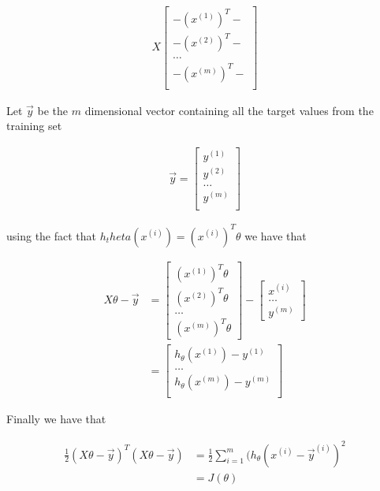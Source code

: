 \documentclass[11pt]{exam}
\newcommand{\idx}[2]{#1^{(#2)}}
\begin{document}
\begin{align*}
X \begin{bmatrix}
- (x^{(1)})^T - \\
- (x^{(2)})^T - \\
\dots\\
- (x^{(m)})^T - \\
\end{bmatrix}
\end{align*}

Let $\vec{y}$ be the $m$ dimensional vector containing all the target values from the training set

\begin{align*}
\vec{y} = \begin{bmatrix}
\idx{y}{1}\\
\idx{y}{2}\\
\dots\\
\idx{y}{m}\\
\end{bmatrix}
\end{align*}

using the fact that $h_theta(\idx{x}{i}) = (\idx{x}{i})^T\theta$ we have that

\begin{align*}
X\theta - \vec{y} &= \begin{bmatrix}
(\idx{x}{1})^T\theta\\
(\idx{x}{2})^T\theta\\
\dots\\
(\idx{x}{m})^T\theta
\end{bmatrix} - \begin{bmatrix}
\idx{x}{i}\\
\dots\\
\idx{y}{m}
\end{bmatrix}\\
&= \begin{bmatrix}
h_\theta(\idx{x}{1}) - \idx{y}{1}\\
\dots\\
h_\theta(\idx{x}{m}) - \idx{y}{m}\\
\end{bmatrix}
\end{align*}

Finally we have that 

\begin{align*}
\frac{1}{2}(X\theta - \vec{y})^T(X\theta - \vec{y}) &= \frac{1}{2}\sum_{i=1}^m (h_\theta(\idx{x}{i} - \vec{y}^{(i)})^2\\
&= J(\theta)
\end{align*}
\end{document}
